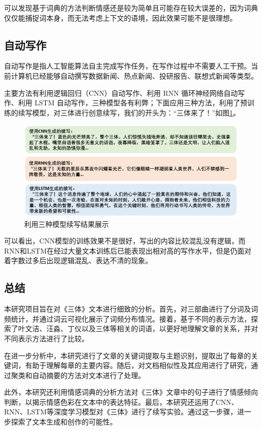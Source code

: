 \documentclass[12pt]{xjtureport}
\begin{document}
可以发现基于词典的方法判断情感还是较为简单且可能存在较大误差的，因为词典仅仅能捕捉词本身，而无法考虑上下文的语境，因此效果可能不是很理想。

\subsection{自动写作}
自动写作是指人工智能算法自主完成写作任务，在写作过程中不需要人工干预。当前计算机已经能够自动撰写数据新闻、热点新闻、投研报告、联想式新闻等类型。

主要方法有利用逻辑回归（CNN）自动写作、利用 RNN 循环神经网络自动写作、利用 LSTM 自动写作，三种模型各有利弊；下面应用三种方法，利用了预训练的续写模型，对三体进行创意续写，我们的开头为：“三体来了！”如图\ref{autowriting}。

\begin{figure}[!htbp]
    \centering
    \includegraphics[width=0.9\linewidth]{figures/续写.png}
    \caption{利用三种模型续写结果展示}
    \label{autowriting}
\end{figure}

可以看出，CNN模型的训练效果不是很好，写出的内容比较混乱没有逻辑，而RNN和LSTM在经过大量文本训练后已能表现出相对高的写作水平，但是仍面对着字数过多后出现逻辑混乱、表达不清的现象。

\subsection{总结}
本研究项目旨在对《三体》文本进行细致的分析。首先，对三部曲进行了分词及词频统计，并通过词云可视化展示了词频分布情况。接着，基于不同的表示方法，探索了叶文洁、汪淼、丁仪以及三体等相关的词语，以更好地理解文章的关系，并对不同表示方法进行了比较。

在进一步分析中，本研究进行了文章的关键词提取与主题识别，提取出了每章的关键词，有助于理解每章的主要内容。随后，对文档相似性及其应用进行了研究，通过聚类和自动摘要的方法对文本进行了处理。

此外，本研究还利用情感词典的分析方法对《三体》文章中的句子进行了情感倾向判断，以揭示情感色彩在文本中的表达特征。最后，本研究还运用了CNN、RNN、LSTM等深度学习模型对《三体》进行了续写实验。通过这一步骤，进一步探索了文本生成和创作的可能性。
\end{document}
